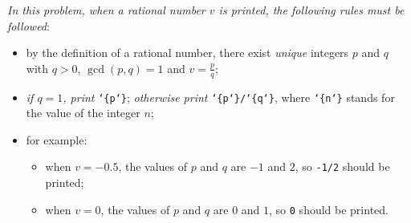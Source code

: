 \documentclass[11pt]{article}
\newcommand{\lbr}{\char`\{}
\newcommand{\rbr}{\char`\}}
\begin{document}
\emph{In this problem, when a rational number $v$ is printed, the following
rules must be followed}:
\begin{itemize}
\item by the definition of a rational number, there exist \emph{unique}
  integers $p$ and $q$ with $q > 0$, $\gcd(p, q) = 1$ and $v = \frac{p}{q}$;
\item \emph{if $q = 1$, print} \texttt{\lbr{}p\rbr{}}; \emph{otherwise print}
  \texttt{\lbr{}p\rbr{}/\lbr{}q\rbr{}},
  where \texttt{\lbr{}n\rbr{}} stands for the value of the integer $n$;
\item for example:
  \begin{itemize}
  \item when $v = -0.5$, the values of $p$ and $q$ are $-1$ and $2$,
    so \texttt{-1/2} should be printed;
  \item when $v = 0$, the values of $p$ and $q$ are $0$ and $1$,
    so \texttt{0} should be printed.
  \end{itemize}
\end{itemize}
\end{document}
